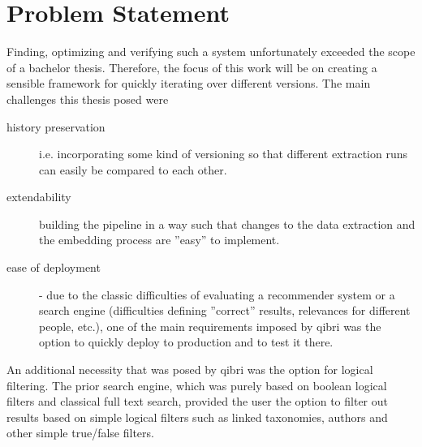 \documentclass[draft,final]{vutinfth} %
\begin{document}
\section{Problem Statement}
Finding, optimizing and verifying such a system unfortunately exceeded the scope of a bachelor thesis. Therefore, the focus of this work will be on creating a sensible framework for quickly iterating over different versions. The main challenges this thesis posed were
\begin{description}
    \item[history preservation] i.e. incorporating some kind of versioning so that different extraction runs can easily be compared to each other.
    \item[extendability] building the pipeline in a way such that changes to the data extraction and the embedding process are ''easy'' to implement.
    \item[ease of deployment] - due to the classic difficulties of evaluating a recommender system or a search engine (difficulties defining ''correct'' results, relevances for different people, etc.), one of the main requirements imposed by qibri was the option to quickly deploy to production and to test it there.
\end{description}

An additional necessity that was posed by qibri was the option for logical filtering. The prior search engine, which was purely based on boolean logical filters and classical full text search, provided the user the option to filter out results based on simple logical filters such as linked taxonomies, authors and other simple true/false filters.
\end{document}
